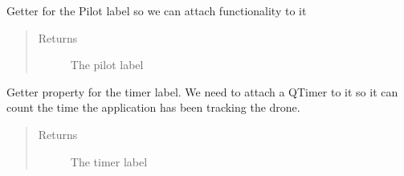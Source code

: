 \documentclass[letterpaper,10pt,english]{sphinxmanual}
\begin{document}
\begin{fulllineitems}
\begin{fulllineitems}
\begin{quote}
\begin{description}
\end{description}\end{quote}

\end{fulllineitems}


\begin{fulllineitems}
\label{\detokenize{index:src.Views.View_TrackingScreen.TrackingWindow.set_LblPilot}}
Getter for the Pilot label so we can attach functionality to it
\begin{quote}\begin{description}
\item[{Returns}] \leavevmode
The pilot label

\end{description}\end{quote}

\end{fulllineitems}


\begin{fulllineitems}
\label{\detokenize{index:src.Views.View_TrackingScreen.TrackingWindow.set_LblTimer}}
Getter property for the timer label. We need to attach a QTimer to it so it can count the time the
application has been tracking the drone.
\begin{quote}\begin{description}
\item[{Returns}] \leavevmode
The timer label

\end{description}\end{quote}

\end{fulllineitems}



\end{fulllineitems}
\end{document}

